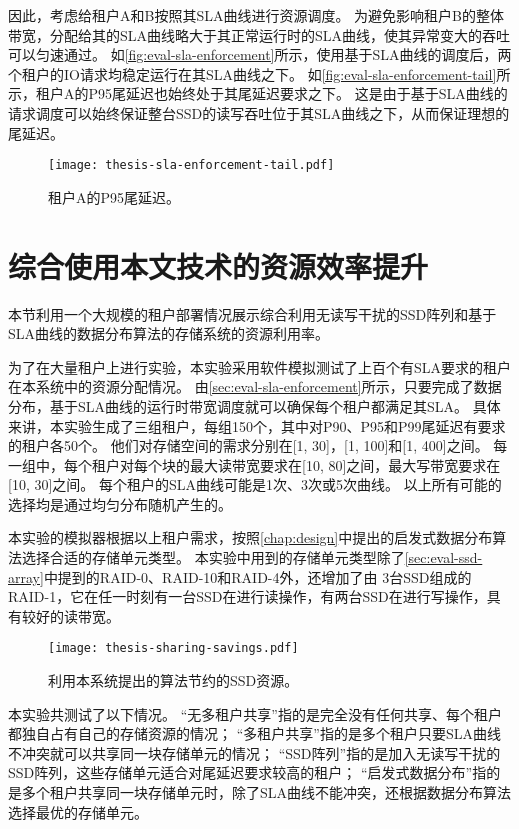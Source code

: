因此，考虑给租户A和B按照其SLA曲线进行资源调度。
为避免影响租户B的整体带宽，分配给其的SLA曲线略大于其正常运行时的SLA曲线，使其异常变大的吞吐可以匀速通过。
如\autoref{fig:eval-sla-enforcement}所示，使用基于SLA曲线的调度后，两个租户的IO请求均稳定运行在其SLA曲线之下。
如\autoref{fig:eval-sla-enforcement-tail}所示，租户A的P95尾延迟也始终处于其尾延迟要求之下。
这是由于基于SLA曲线的请求调度可以始终保证整台SSD的读写吞吐位于其SLA曲线之下，从而保证理想的尾延迟。

\begin{figure}[h]
  \centering
  \texttt{[image: thesis-sla-enforcement-tail.pdf]}
  \caption{
        租户A的P95尾延迟。
      }
  \label{fig:eval-sla-enforcement-tail}
\end{figure}

\section{综合使用本文技术的资源效率提升}
\label{sec:eval-sla-placement}

本节利用一个大规模的租户部署情况展示综合利用无读写干扰的SSD阵列和基于SLA曲线的数据分布算法的存储系统的资源利用率。

为了在大量租户上进行实验，本实验采用软件模拟测试了上百个有SLA要求的租户在本系统中的资源分配情况。
由\autoref{sec:eval-sla-enforcement}所示，只要完成了数据分布，基于SLA曲线的运行时带宽调度就可以确保每个租户都满足其SLA。
具体来讲，本实验生成了三组租户，每组150个，其中对P90、P95和P99尾延迟有要求的租户各50个。
他们对存储空间的需求分别在[1, 30]，[1, 100]和[1, 400]之间。
每一组中，每个租户对每个块的最大读带宽要求在[10, 80]之间，最大写带宽要求在[10, 30]之间。
每个租户的SLA曲线可能是1次、3次或5次曲线。
以上所有可能的选择均是通过均匀分布随机产生的。

本实验的模拟器根据以上租户需求，按照\autoref{chap:design}中提出的启发式数据分布算法选择合适的存储单元类型。
本实验中用到的存储单元类型除了\autoref{sec:eval-ssd-array}中提到的RAID-0、RAID-10和RAID-4外，还增加了由
3台SSD组成的RAID-1，它在任一时刻有一台SSD在进行读操作，有两台SSD在进行写操作，具有较好的读带宽。

\begin{figure}[h]
  \centering
  \texttt{[image: thesis-sharing-savings.pdf]}
  \caption{
        利用本系统提出的算法节约的SSD资源。
      }
  \label{fig:eval-sharing-savings}
\end{figure}

本实验共测试了以下情况。
“无多租户共享”指的是完全没有任何共享、每个租户都独自占有自己的存储资源的情况；
“多租户共享”指的是多个租户只要SLA曲线不冲突就可以共享同一块存储单元的情况；
“SSD阵列”指的是加入无读写干扰的SSD阵列，这些存储单元适合对尾延迟要求较高的租户；
“启发式数据分布”指的是多个租户共享同一块存储单元时，除了SLA曲线不能冲突，还根据数据分布算法选择最优的存储单元。

